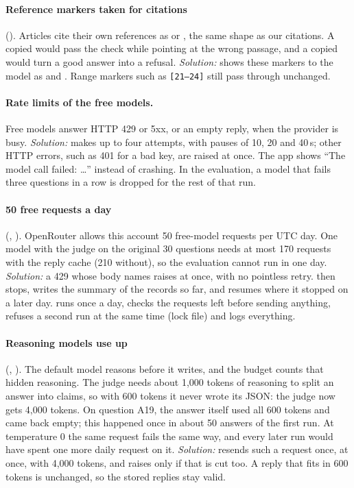 \paragraph{Reference markers taken for citations} ().
Articles cite their own references as \code{[12]} or \code{[3, 4]}, the same shape as our citations.
A copied \code{[3]} would pass the check while pointing at the wrong passage, and a copied
\code{[12]} would turn a good answer into a refusal. \emph{Solution:}  shows
these markers to the model as  and . Range markers such as \texttt{[21--24]}
still pass through unchanged.

\paragraph{Rate limits of the free models.}
Free models answer HTTP 429 or 5xx, or an empty reply, when the provider is busy. \emph{Solution:}
 makes up to four attempts, with pauses of 10, 20 and 40\,s; other HTTP errors, such
as 401 for a bad key, are raised at once. The app shows ``The model call failed: \ldots'' instead of
crashing. In the evaluation, a model that fails three questions in a row is dropped for the rest of
that run.

\paragraph{50 free requests a day} (, ).
OpenRouter allows this account 50 free-model requests per UTC day. One model with the judge on the
original 30 questions needs at most 170 requests with the reply cache (210 without), so the
evaluation cannot run in one day. \emph{Solution:} a 429 whose body names
 raises  at once, with no pointless retry. 
then stops, writes the summary of the records so far, and resumes where it stopped on a later day.
 runs once a day, checks the requests left before sending anything,
refuses a second run at the same time (lock file) and logs everything.

\paragraph{Reasoning models use up } (, ).
The default model reasons before it writes, and the budget counts that hidden reasoning. The judge
needs about 1{,}000 tokens of reasoning to split an answer into claims, so with 600 tokens it never
wrote its JSON: the judge now gets 4{,}000 tokens. On question A19, the answer itself used all 600
tokens and came back empty; this happened once in about 50 answers of the first run. At
temperature 0 the same request fails the same way, and every later run would have spent one more
daily request on it. \emph{Solution:}  resends such a request once, at once, with
4{,}000 tokens, and raises only if that is cut too. A reply that fits in 600 tokens is unchanged, so
the stored replies stay valid.

